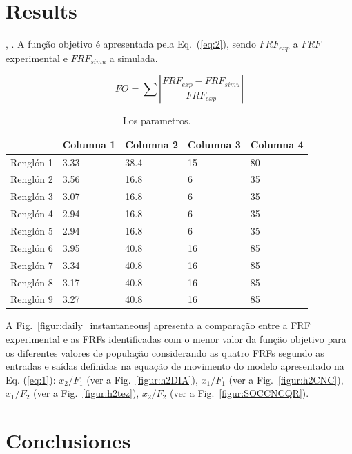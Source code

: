 \documentclass[journal, twoside]{IEEEtran}
\begin{document}
      
      
      

\section{Results}

\lipsum[5-10]  \cite{koroishi2016robust}, \cite{ahlawat2001multiobjective}.
 A função objetivo é apresentada pela Eq.~(\ref{eq:2}), sendo $FRF_{exp}$ a $FRF$ experimental e $FRF_{simu}$ a simulada.

\begin{equation}
	FO=\sum \left| \frac{FRF_{exp}- FRF_{simu}}{FRF_{exp}} \right|
	\label{eq:2}
\end{equation}

\begin{table}[!t]
	\caption{Los parametros.}
	\label{tab:FO}
	\centering
		\begin{tabular}{lllll} %
		\hline
	\hline
	&	Columna 1	&	Columna 2	&	Columna 3	&	Columna 4	\\
	\hline
Renglón 1	&	3.33	&	38.4	&	15	&	80	\\
Renglón 2	&	3.56	&	16.8	&	6	&	35	\\
Renglón 3	&	3.07	&	16.8	&	6	&	35	\\
Renglón 4	&	2.94	&	16.8	&	6	&	35	\\
Renglón 5	&	2.94	&	16.8	&	6	&	35	\\
Renglón 6	&	3.95	&	40.8	&	16	&	85	\\
Renglón 7	&	3.34	&	40.8	&	16	&	85	\\
Renglón 8	&	3.17	&	40.8	&	16	&	85	\\
Renglón 9	&	3.27	&	40.8	&	16	&	85	\\
		\hline
	\hline
	\end{tabular}%
\end{table}

A Fig.~\ref{figur:daily_instantaneous} apresenta a comparação entre a FRF experimental e as FRFs identificadas com o menor valor da função objetivo para os diferentes valores de população considerando as quatro FRFs segundo as entradas e saídas definidas na equação de movimento do modelo apresentado na Eq. (\ref{eq:1}): $x_2/F_1$ (ver a Fig.~\ref{figur:h2DIA}), $x_1/F_1$ (ver a Fig.~\ref{figur:h2CNC}), $x_1/F_2$ (ver a Fig.~\ref{figur:h2tez}), $x_2/F_2$ (ver a Fig.~\ref{figur:SOCCNCQR}). \cite{ahlawat2001multiobjective}

\lipsum[11-15]

\section{Conclusiones}
\end{document}
